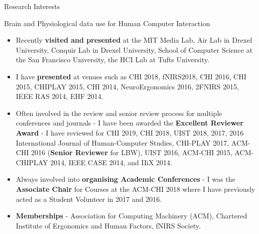 \documentclass{resume} %
\begin{document}
\begin{rSection}{Research Interests}
\begin{rSubsection}{Brain and Physiological data use for Human Computer Interaction}{ }{ }{ }
\begin{itemize}
	\item Recently \textbf{visited and presented} at the MIT Media Lab, Air Lab in Drexel University, Conquir Lab in Drexel University, School of Computer Science at the San Francisco University, the HCI Lab at Tufts University.
	\item I have  \textbf{presented} at venues such as CHI 2018, fNIRS2018, CHI 2016, CHI 2015, CHIPLAY 2015, CHI 2014, NeuroErgonomics 2016, 2FNIRS 2015, IEEE RAS 2014, EHF 2014.
	\vspace{-2mm}
	\item Often involved in the review and senior review process for multiple conferences and journals - I have been awarded the \textbf{Excellent Reviewer Award} - I have reviewed for CHI 2019, CHI 2018, UIST 2018, 2017, 2016 International Journal of Human-Computer Studies, CHI-PLAY 2017, ACM-CHI 2016 (\textbf{Senior Reviewer} for LBW), UIST 2016, ACM-CHI 2015, ACM-CHIPLAY 2014, IEEE CASE 2014, and IIiX 2014.
	\vspace{-2mm}
	\item Always involved into \textbf{organising Academic Conferences} - I was the \textbf{Associate Chair} for Courses at the ACM-CHI 2018 where I have previously acted as a Student Volunteer in 2017 and 2016.
	\vspace{-2mm}
	\item  \textbf{Memberships} - Association for Computing Machinery (ACM), Chartered Institute of Ergonomics and Human Factors, fNIRS Society.
\end{itemize}

\end{rSubsection}

\end{rSection}
	\vspace{-3mm}
\end{document}
